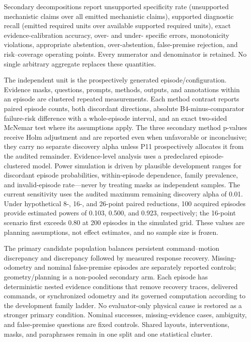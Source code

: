 \documentclass[conference]{IEEEtran}
\begin{document}
Secondary decompositions report unsupported specificity rate (unsupported mechanistic claims over
all emitted mechanistic claims), supported diagnostic recall (emitted required units over
available supported required units), exact evidence-calibration accuracy, over- and under-
specific errors, monotonicity violations, appropriate abstention, over-abstention, false-premise
rejection, and risk--coverage operating points. Every numerator and denominator is retained. No
single arbitrary aggregate replaces these quantities.

The independent unit is the prospectively generated episode/configuration. Evidence masks,
questions, prompts, methods, outputs, and annotations within an episode are clustered repeated
measurements. Each method contrast reports paired episode counts, both discordant directions,
absolute B4-minus-comparator failure-risk difference with a whole-episode interval, and an exact
two-sided McNemar test where its assumptions apply. The three secondary method p-values receive
Holm adjustment and are reported even when unfavorable or inconclusive; they carry no separate
discovery alpha unless P11 prospectively allocates it from the audited remainder. Evidence-level
analysis uses a predeclared episode-clustered model. Power simulation is driven by plausible development
ranges for discordant episode probabilities, within-episode dependence, family prevalence, and
invalid-episode rate---never by treating masks as independent samples.
The current sensitivity uses the audited maximum remaining discovery alpha of 0.01. Under
hypothetical 8-, 16-, and 26-point paired reductions, 100 acquired episodes provide estimated
powers of 0.103, 0.500, and 0.923, respectively; the 16-point scenario first exceeds 0.80 at 200
episodes in the simulated grid. These values are planning assumptions, not effect estimates, and
no sample size is frozen.

The primary candidate population balances persistent command--motion discrepancy and discrepancy
followed by measured response recovery. Missing-odometry and nominal false-premise episodes are
separately reported controls; geometry/planning is a non-pooled secondary arm. Each episode has
deterministic nested evidence conditions that
remove recovery traces, delivered commands, or synchronized odometry and its governed computation
according to the development family ladder. No evaluator-only physical cause is restored as a
stronger primary condition. Nominal successes, missing-evidence cases, ambiguity, and
false-premise questions are fixed controls. Shared layouts, interventions, masks, and paraphrases
remain in one split and one statistical cluster.
\end{document}
